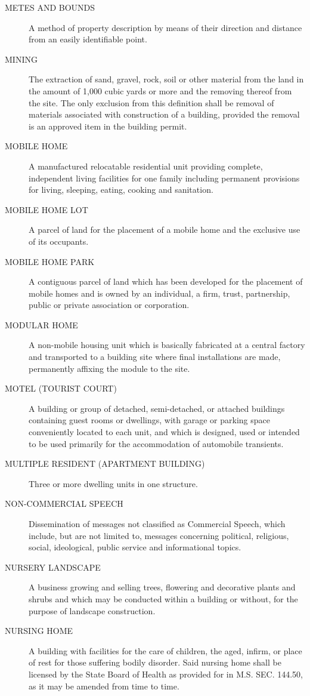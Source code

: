 \begin{description}
    \item[METES AND BOUNDS] A method of property description by means of their direction and distance from an easily identifiable point.
    \item[MINING] The extraction of sand, gravel, rock, soil or other material from the land in the amount of 1,000 cubic yards or more and the removing thereof from the site.  The only exclusion from this definition shall be removal of materials associated with construction of a building, provided the removal is an approved item in the building permit.
    \item[MOBILE HOME] A manufactured relocatable residential unit providing complete, independent living facilities for one family including permanent provisions for living, sleeping, eating, cooking and sanitation.
    \item[MOBILE HOME LOT] A parcel of land for the placement of a mobile home and the exclusive use of its occupants.
    \item[MOBILE HOME PARK] A contiguous parcel of land which has been developed for the placement of mobile homes and is owned by an individual, a firm, trust, partnership, public or private association or corporation.
    \item[MODULAR HOME] A non-mobile housing unit which is basically fabricated at a central factory and transported to a building site where final installations are made, permanently affixing the module to the site.
    \item[MOTEL (TOURIST COURT)] A building or group of detached, semi-detached, or attached buildings containing guest rooms or dwellings, with garage or parking space conveniently located to each unit, and which is designed, used or intended to be used primarily for the accommodation of automobile transients.
    \item[MULTIPLE RESIDENT (APARTMENT BUILDING)] Three or more dwelling units in one structure.
    \item[NON-COMMERCIAL SPEECH] Dissemination of messages not classified as Commercial Speech, which include, but are not limited to, messages concerning political, religious, social, ideological, public service and informational topics.
    \item[NURSERY LANDSCAPE] A business growing and selling trees, flowering and decorative plants and shrubs and which may be conducted within a building or without, for the purpose of landscape construction.
    \item[NURSING HOME] A building with facilities for the care of children, the aged, infirm, or place of rest for those suffering bodily disorder. Said nursing home shall be licensed by the State Board of Health as provided for in M.S. SEC. 144.50, as it may be amended from time to time.

\end{description}
